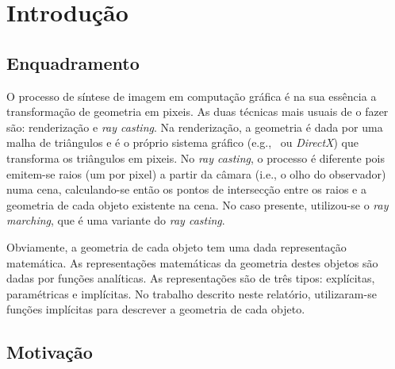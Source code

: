 \chapter{Introdução}
\label{ch::intro}

\section{Enquadramento}
\label{sec::intro:enquadramento}

%


O processo de síntese de imagem em computação gráfica é na sua essência a transformação de geometria em pixeis. As duas técnicas mais usuais de o fazer são: renderização e \emph{ray casting}. Na renderização, a geometria é dada por uma malha de triângulos e é o próprio sistema gráfico (e.g., \opengl~ou \textit{DirectX}) que transforma os triângulos em pixeis. No \emph{ray casting}, o processo é diferente pois emitem-se raios (um por pixel) a partir da câmara (i.e., o olho do observador) numa cena, calculando-se então os pontos de intersecção entre os raios e a geometria de cada objeto existente na cena. No caso presente, utilizou-se o \emph{ray marching}, que é uma variante do \emph{ray casting}.

Obviamente, a geometria de cada objeto tem uma dada representação matemática. As representações matemáticas da geometria destes objetos são dadas por funções analíticas. As representações são de três tipos: explícitas, paramétricas e implícitas. No trabalho descrito neste relatório, utilizaram-se funções implícitas para descrever a geometria de cada objeto.


\section{Motivação}
\label{sec::intro:motivacao}

